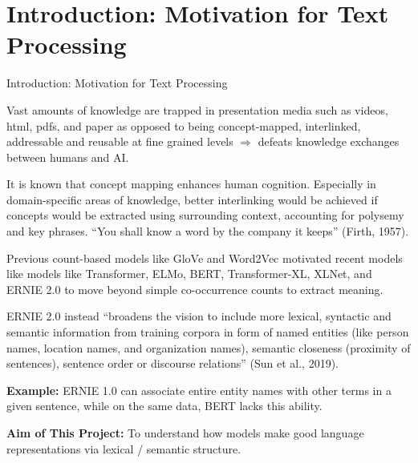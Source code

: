 
\section{Introduction: Motivation for Text Processing}


\begin{frame}{Introduction: Motivation for Text Processing} %



\begin{itemizeSpaced}{7pt}

    \item Vast amounts of knowledge are trapped in presentation media such as videos, html, pdfs, and paper as opposed to being concept-mapped, interlinked, addressable and reusable at fine grained levels $\Rightarrow$ defeats knowledge exchanges between humans and AI.
    
    \item It is known that concept mapping enhances human cognition. Especially in domain-specific areas of knowledge, better interlinking would be achieved if concepts would be extracted using surrounding context, accounting for polysemy and key phrases. “You shall know a word by the company it keeps” (Firth, 1957).
    
    
    \item Previous count-based models like GloVe and Word2Vec motivated recent models like models like Transformer, ELMo, BERT, Transformer-XL, XLNet, and ERNIE 2.0 to move beyond simple co-occurrence counts to extract meaning. 
    
    \item ERNIE 2.0 instead “broadens the vision to include more lexical, syntactic and semantic information from training corpora in form of named entities (like person names, location names, and organization names), semantic closeness (proximity of sentences), sentence order or discourse relations” (Sun et al., 2019). 
    
    \item \textbf{Example:} ERNIE 1.0 can associate entire entity names with other terms in a given sentence, while on the same data, BERT lacks this ability.
    
    \item \textbf{Aim of This Project: } To understand how models make good language representations via lexical / semantic structure.
    
    
\end{itemizeSpaced}
\end{frame}






